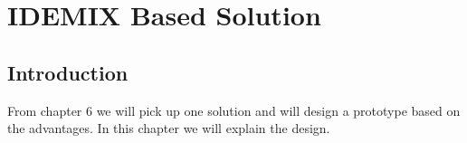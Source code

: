 \chapter{IDEMIX Based Solution}
\section{Introduction}
From chapter 6 we will pick up one solution and will design a prototype based on the advantages. In this chapter we will explain the design.